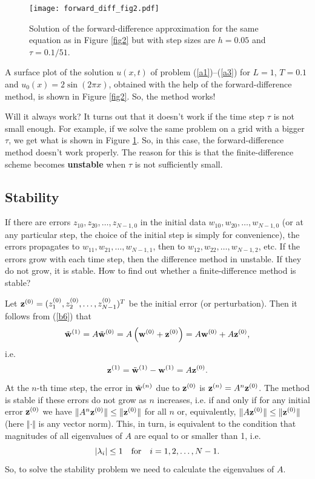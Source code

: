 {{\begin{figure}[h]
\centering
\texttt{[image: forward\_diff\_fig2.pdf]}
\caption{Solution of the forward-difference approximation for the same
equation as in Figure \ref{fig2} but with step sizes are $h=0.05$ and $\tau=0.1/51$.}
\label{fig3}
\end{figure}
A surface plot of the solution $u(x,t)$ of problem (\ref{a1})--(\ref{a3}) for $L=1$, $T=0.1$
and $u_{0}(x)=2 \sin(2\pi x)$, obtained with the help of the forward-difference
method, is shown in Figure \ref{fig2}. So, the method works!

Will it always work? It turns out that it doesn't work if the time step $\tau$ is not small enough.
For example, if we solve the same problem on a grid with a bigger $\tau$, we get what is shown in Figure \ref{fig3}.
So, in this case, the forward-difference method doesn't work properly. The reason for this is that
the finite-difference scheme becomes \textbf{unstable} when $\tau$ is not sufficiently small.



\subsection{Stability}

 
If there are errors $z_{10},
z_{20},\dots, z_{N-1,0}$ in the initial data $w_{10},w_{20},\dots,
w_{N-1,0}$ (or at any particular step, the choice of the initial
step is simply for convenience), the errors propagates to
$w_{11},w_{21},\dots, w_{N-1,1}$, then to 
\linebreak[4]$w_{12},w_{22},\dots,
w_{N-1,2}$, etc. If the errors grow with each time step, then the
difference method in unstable. If they do not grow, it is stable.
How to find out whether a finite-difference method is stable?

Let ${\bf z}^{(0)}=(z_{1}^{(0)}, z_{2}^{(0)},\dots, z_{N-1}^{(0)})^{T}$
be the initial error (or perturbation). Then it follows from (\ref{b6})
that
\[
\tilde{\bf w}^{(1)}=A\tilde{\bf w}^{(0)}=A\left({\bf w}^{(0)}+{\bf z}^{(0)}\right)=A{\bf w}^{(0)}+A{\bf z}^{(0)},
\]
i.e.
\[
{\bf z}^{(1)}=\tilde{\bf w}^{(1)}-{\bf w}^{(1)}=A{\bf z}^{(0)}.
\]
At the $n$-th time step, the error in $\tilde{\bf w}^{(n)}$
due to ${\bf z}^{(0)}$ is ${\bf z}^{(n)}=A^{n}{\bf z}^{(0)}$.
The method is stable if these errors do not grow as $n$ increases, i.e. if and only if
for any initial error ${\bf z}^{(0)}$ we have $\Vert A^{n}{\bf z}^{(0)}\Vert\leq \Vert {\bf z}^{(0)}\Vert$
for all $n$ or, equivalently, $\Vert A{\bf z}^{(0)}\Vert\leq \Vert {\bf z}^{(0)}\Vert$ (here $\Vert\cdot\Vert$
is any vector norm). This, in turn, is
equivalent to the condition that magnitudes of all eigenvalues of $A$ are equal to or smaller than 1,
i.e.
\[
\vert\lambda_{i}\vert\leq 1 \quad \hbox{for} \quad i=1, 2, \dots, N-1.
\]
So, to solve the stability problem we need to calculate the eigenvalues of $A$. 

}}
